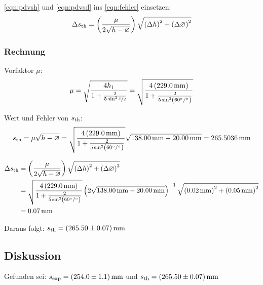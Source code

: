 \documentclass[twoside]{article}
\begin{document}
            \eqref{eqn:pdvsh} und \eqref{eqn:pdvsd} ins \eqref{eqn:fehler} einsetzen:
            \begin{equation}
                \Delta \sth = \left(\frac{\mu}{2\sqrt{h-\varnothing}}\right)\sqrt{\left(\Delta h\right)^2 + \left(\Delta \varnothing \right)^2}
            \end{equation}

        \pagebreak[1]
        \subsubsection{Rechnung}
            Vorfaktor $\mu$:
            \begin{equation}
                \mu = \sqrt{\frac{4h_1}{1+\frac{2}{5\sin^2 \nicefrac{\beta}{2}}}} = \sqrt{\frac{4\left(\SI{229.0}{\milli\meter}\right)}{1+\frac{2}{5\sin^2 \left(\SI{60}{\degree}/\SI{}{\degree}\right)}}}
            \end{equation}

            Wert und Fehler von $\sth$:
            \begin{equation}
                \sth = \mu\sqrt{h - \varnothing} = \sqrt{\frac{4\left(\SI{229.0}{\milli\meter}\right)}{1+\frac{2}{5\sin^2 \left(\SI{60}{\degree}/\SI{}{\degree}\right)}}} \sqrt{\SI{138.00}{\milli\meter} - \SI{20,00}{\milli\meter}} = \SI{265.5036}{\milli\meter}
            \end{equation}

            \begin{align}
                \Delta \sth &= \left(\frac{\mu}{2\sqrt{h-\varnothing}}\right)\sqrt{\left(\Delta h\right)^2 + \left(\Delta \varnothing \right)^2} \notag \\
                &= \sqrt{\frac{4\left(\SI{229.0}{\milli\meter}\right)}{1+\frac{2}{5\sin^2 \left(\SI{60}{\degree}/\SI{}{\degree}\right)}}}\left(2\sqrt{\SI{138.00}{\milli\meter} - \SI{20,00}{\milli\meter}}\right)^{-1} \sqrt{\left(\SI{0,02}{\milli\meter}\right)^2 + \left(\SI{0,05}{\milli\meter} \right)^2} \notag \\
                &= \SI{0.07}{\milli\meter}
            \end{align}

            Daraus folgt: $\sth = \SI{265.50(7)}{\milli\meter}$

    \subsection{Diskussion}
        Gefunden sei: $\sexp = \SI{254.0(11)}{\milli\meter}$ und $\sth = \SI{265.50(7)}{\milli\meter}$
\end{document}
